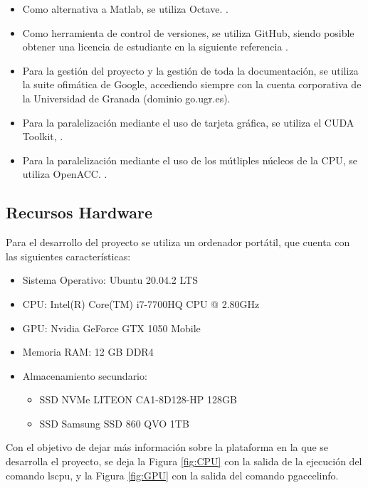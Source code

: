 \begin{itemize}
    \item Como alternativa a Matlab, se utiliza Octave. \cite{unknown-author-2021B}.
    \item Como herramienta de control de versiones, se utiliza GitHub, siendo posible obtener una licencia de estudiante en la siguiente referencia \cite{unknown-author-2021}.
    \item Para la gestión del proyecto y la gestión de toda la documentación, se utiliza la suite ofimática de Google, accediendo siempre con la cuenta corporativa de la Universidad de Granada (dominio go.ugr.es).
    \item Para la paralelización mediante el uso de tarjeta gráfica, se utiliza el CUDA Toolkit, \cite{unknown-author-no-date}.
    \item Para la paralelización mediante el uso de los mútliples núcleos de la CPU, se utiliza OpenACC. \cite{unknown-author-no-dateB}.
\end{itemize}

\subsection{Recursos Hardware}
\label{RecursosHardware}
Para el desarrollo del proyecto se utiliza un ordenador portátil, que cuenta con las siguientes características:

\begin{itemize}
    \item Sistema Operativo: Ubuntu 20.04.2 LTS
    \item CPU: Intel(R) Core(TM) i7-7700HQ CPU @ 2.80GHz
    \item GPU: Nvidia GeForce GTX 1050 Mobile
    \item Memoria RAM: 12 GB DDR4
    \item Almacenamiento secundario:
    \begin{itemize}
        \item SSD NVMe LITEON CA1-8D128-HP 128GB
        \item SSD Samsung SSD 860 QVO 1TB
    \end{itemize} 
\end{itemize}

Con el objetivo de dejar más información sobre la plataforma en la que se desarrolla el proyecto, se deja la Figura \ref{fig:CPU} con la salida de la ejecución del comando lscpu, y la Figura \ref{fig:GPU} con la salida del comando pgaccelinfo.


